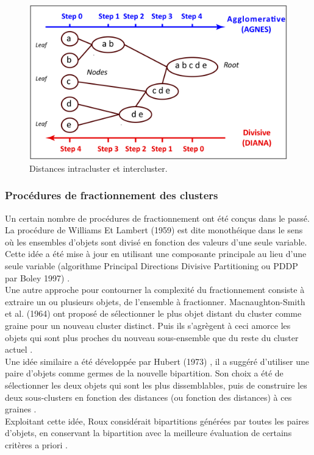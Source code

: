 \begin{figure}[H]
	\begin{center}
		\includegraphics[scale=0.15]{images/chapitre6/hierarchical_agglo_divisive.png}
	\end{center}
\caption{Distances intracluster et intercluster.}
\label{hierarchical_agglo_divisive_illust}
\end{figure}

\subsubsection{Procédures de fractionnement des clusters}
Un certain nombre de procédures de fractionnement ont été conçus dans le passé. La procédure de Williams Et Lambert (1959) \cite{williams1959multivariate} est dite monothéique dans le sens où les ensembles d'objets sont divisé en fonction des valeurs d'une seule variable. Cette idée a été mise à jour en utilisant une composante principale au lieu d'une seule variable (algorithme Principal Directions Divisive Partitioning ou PDDP par Boley 1997) \cite{roux2018comparative}. \\
Une autre approche pour contourner la complexité du fractionnement consiste à extraire un ou plusieurs objets, de l'ensemble à fractionner. Macnaughton-Smith et al. (1964) \cite{macnaughton1964dissimilarity} ont proposé de sélectionner le plus objet distant du cluster comme graine pour un nouveau cluster distinct. Puis ils s'agrègent à ceci amorce les objets qui sont plus proches du nouveau sous-ensemble que du reste du cluster actuel \cite{roux2018comparative}. \\
Une idée similaire a été développée par Hubert (1973) \cite{hubert1973monotone}, il a suggéré d'utiliser une paire d'objets comme germes de la nouvelle bipartition. Son choix a été de sélectionner les deux objets qui sont les plus dissemblables, puis de construire les deux sous-clusters en fonction des distances (ou fonction des distances) à ces graines \cite{roux2018comparative}. \\
Exploitant cette idée, Roux \cite{roux1991basic} \cite{roux1995divisive} considérait bipartitions générées par toutes les paires d'objets, en conservant la bipartition avec la meilleure évaluation de certains critères a priori \cite{roux2018comparative}. \\

